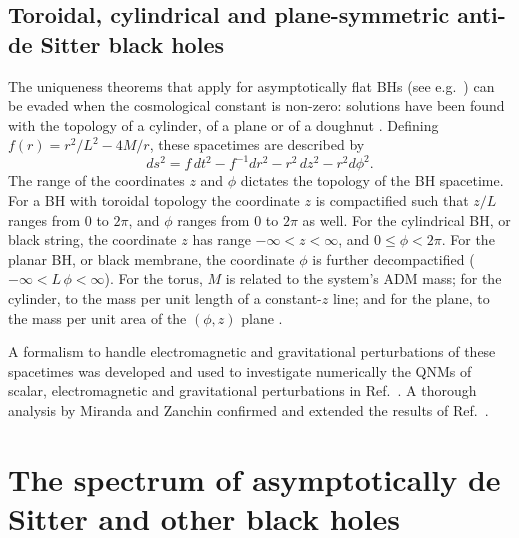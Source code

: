 \documentclass[]{iopart}
\def\be{\begin{equation}}
\def\ee{\end{equation}}
\begin{document}
\subsection{Toroidal, cylindrical and plane-symmetric anti-de Sitter black holes}

The uniqueness theorems that apply for asymptotically flat BHs (see
e.g.~\cite{Heusler:1998ua}) can be evaded when the cosmological constant is
non-zero: solutions have been found with the topology of a cylinder, of a
plane or of a doughnut
\cite{Lemos:1994fn,Lemos:1994xp,Lemos:1995cm,Mann:1996gj,Vanzo:1997gw,
  Birmingham:1998nr}. Defining $f(r)=r^2/L^2-4M/r$, these spacetimes are
described by
%
\be
ds^{2}= f\,dt^{2}- f^{-1}dr^{2}-r^2\,dz^{2}-r^{2}d\phi^{2}.
\ee
%
The range of the coordinates $z$ and $\phi$ dictates the topology of the BH
spacetime. For a BH with toroidal topology the coordinate $z$ is compactified
such that $z/L$ ranges from $0$ to $2\pi$, and $\phi$ ranges from $0$ to
$2\pi$ as well. For the cylindrical BH, or black string, the coordinate $z$
has range $-\infty<z<\infty$, and $0\leq \phi <2\pi$. For the planar BH, or
black membrane, the coordinate $\phi$ is further decompactified
($-\infty<L\,\phi<\infty$).  For the torus, $M$ is related to the system's ADM
mass; for the cylinder, to the mass per unit length of a constant-$z$ line;
and for the plane, to the mass per unit area of the $(\phi, z)$ plane
\cite{Lemos:1994fn,Lemos:1994xp,Lemos:1995cm,Mann:1996gj,Vanzo:1997gw,
  Birmingham:1998nr}.

A formalism to handle electromagnetic and gravitational perturbations of these
spacetimes was developed and used to investigate numerically the QNMs of
scalar, electromagnetic and gravitational perturbations in
Ref.~\cite{Cardoso:2001vs}. A thorough analysis by Miranda and Zanchin
\cite{Miranda:2005qx,Miranda:2008vb} confirmed and extended the results of
Ref.~\cite{Cardoso:2001vs}.

\section{\label{sec:catalogue}The spectrum of asymptotically de Sitter and other black holes}

\end{document}
